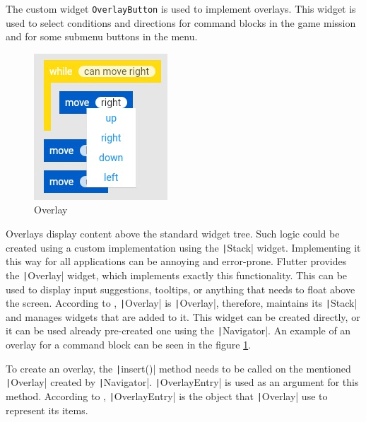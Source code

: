 The custom widget \texttt{OverlayButton} is used to implement overlays.
This widget is used to select conditions and directions for command blocks in the game mission and for some submenu buttons in the menu.

\begin{figure}
    \centering
    \includegraphics[width=0.4\linewidth]{assets/implementation/overlay.jpeg}
    \caption{Overlay}
    \label{fig:overlay}
\end{figure}

Overlays display content above the standard widget tree.
Such logic could be created using a custom implementation using the \texttt|Stack| widget.
Implementing it this way for all applications can be annoying and error-prone.
Flutter provides the \texttt|Overlay| widget, which implements exactly this functionality.
This can be used to display input suggestions, tooltips, or anything that needs to float above the screen.
According to \cite{a2022_material}, \texttt|Overlay| is 
\texttt|Overlay|, therefore, maintains its \texttt|Stack| and manages widgets that are added to it.
This widget can be created directly, or it can be used already pre-created one using the \texttt|Navigator|.
An example of an overlay for a command block can be seen in the figure \ref{fig:overlay}.

To create an overlay, the \texttt|insert()| method needs to be called on the mentioned \texttt|Overlay| created by \texttt|Navigator|.
\texttt|OverlayEntry| is used as an argument for this method.
According to \cite{a2022_material}, \texttt|OverlayEntry| is the object that \texttt|Overlay| use to represent its items.

